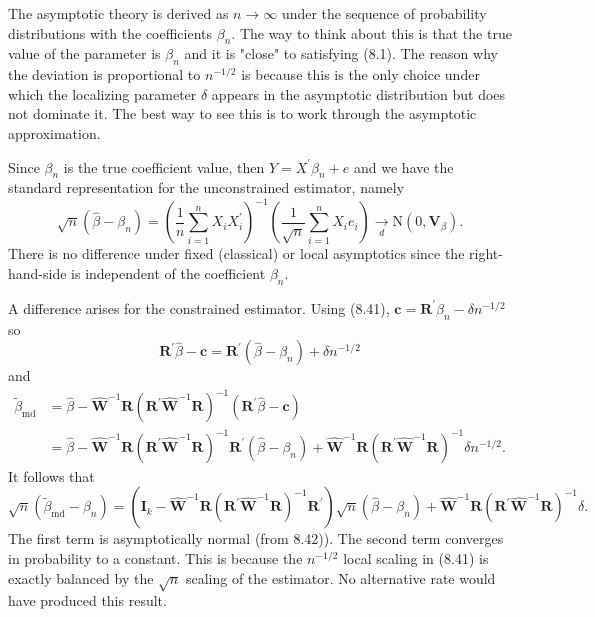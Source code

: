 \documentclass[10pt]{article}
\begin{document}
The asymptotic theory is derived as $n \rightarrow \infty$ under the sequence of probability distributions with the coefficients $\beta_{n}$. The way to think about this is that the true value of the parameter is $\beta_{n}$ and it is "close" to satisfying (8.1). The reason why the deviation is proportional to $n^{-1 / 2}$ is because this is the only choice under which the localizing parameter $\delta$ appears in the asymptotic distribution but does not dominate it. The best way to see this is to work through the asymptotic approximation.

Since $\beta_{n}$ is the true coefficient value, then $Y=X^{\prime} \beta_{n}+e$ and we have the standard representation for the unconstrained estimator, namely
$$
\sqrt{n}\left(\widehat{\beta}-\beta_{n}\right)=\left(\frac{1}{n} \sum_{i=1}^{n} X_{i} X_{i}^{\prime}\right)^{-1}\left(\frac{1}{\sqrt{n}} \sum_{i=1}^{n} X_{i} e_{i}\right) \underset{d}{\longrightarrow} \mathrm{N}\left(0, \boldsymbol{V}_{\beta}\right) .
$$
There is no difference under fixed (classical) or local asymptotics since the right-hand-side is independent of the coefficient $\beta_{n}$.

A difference arises for the constrained estimator. Using (8.41), $\boldsymbol{c}=\boldsymbol{R}^{\prime} \beta_{n}-\delta n^{-1 / 2}$ so
$$
\boldsymbol{R}^{\prime} \widehat{\beta}-\boldsymbol{c}=\boldsymbol{R}^{\prime}\left(\widehat{\beta}-\beta_{n}\right)+\delta n^{-1 / 2}
$$
and
$$
\begin{aligned}
\widetilde{\beta}_{\mathrm{md}} &=\widehat{\beta}-\widehat{\boldsymbol{W}}^{-1} \boldsymbol{R}\left(\boldsymbol{R}^{\prime} \widehat{\boldsymbol{W}}^{-1} \boldsymbol{R}\right)^{-1}\left(\boldsymbol{R}^{\prime} \widehat{\beta}-\boldsymbol{c}\right) \\
&=\widehat{\beta}-\widehat{\boldsymbol{W}}^{-1} \boldsymbol{R}\left(\boldsymbol{R}^{\prime} \widehat{\boldsymbol{W}}^{-1} \boldsymbol{R}\right)^{-1} \boldsymbol{R}^{\prime}\left(\widehat{\beta}-\beta_{n}\right)+\widehat{\boldsymbol{W}}^{-1} \boldsymbol{R}\left(\boldsymbol{R}^{\prime} \widehat{\boldsymbol{W}}^{-1} \boldsymbol{R}\right)^{-1} \delta n^{-1 / 2} .
\end{aligned}
$$
It follows that
$$
\sqrt{n}\left(\widetilde{\beta}_{\mathrm{md}}-\beta_{n}\right)=\left(\boldsymbol{I}_{k}-\widehat{\boldsymbol{W}}^{-1} \boldsymbol{R}\left(\boldsymbol{R}^{\prime} \widehat{\boldsymbol{W}}^{-1} \boldsymbol{R}\right)^{-1} \boldsymbol{R}^{\prime}\right) \sqrt{n}\left(\widehat{\beta}-\beta_{n}\right)+\widehat{\boldsymbol{W}}^{-1} \boldsymbol{R}\left(\boldsymbol{R}^{\prime} \widehat{\boldsymbol{W}}^{-1} \boldsymbol{R}\right)^{-1} \delta .
$$
The first term is asymptotically normal (from 8.42)). The second term converges in probability to a constant. This is because the $n^{-1 / 2}$ local scaling in (8.41) is exactly balanced by the $\sqrt{n}$ scaling of the estimator. No alternative rate would have produced this result.
\end{document}
